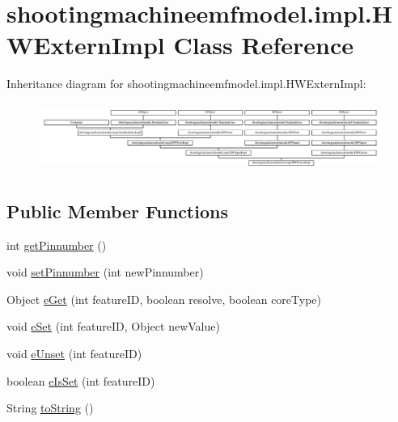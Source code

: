 \hypertarget{classshootingmachineemfmodel_1_1impl_1_1_h_w_extern_impl}{\section{shootingmachineemfmodel.\-impl.\-H\-W\-Extern\-Impl Class Reference}
\label{classshootingmachineemfmodel_1_1impl_1_1_h_w_extern_impl}
}
Inheritance diagram for shootingmachineemfmodel.\-impl.\-H\-W\-Extern\-Impl\-:\begin{figure}[H]
\begin{center}
\leavevmode
\includegraphics[height=2.247492cm]{classshootingmachineemfmodel_1_1impl_1_1_h_w_extern_impl}
\end{center}
\end{figure}
\subsection*{Public Member Functions}
\begin{DoxyCompactItemize}
\item 
int \hyperlink{classshootingmachineemfmodel_1_1impl_1_1_h_w_extern_impl_a86c10c1bc44b1145a93323d6b4abff06}{get\-Pinnumber} ()
\item 
void \hyperlink{classshootingmachineemfmodel_1_1impl_1_1_h_w_extern_impl_a9e4e54dce74f1fc40dbdefa81af30133}{set\-Pinnumber} (int new\-Pinnumber)
\item 
Object \hyperlink{classshootingmachineemfmodel_1_1impl_1_1_h_w_extern_impl_a4e1c5295f9c3786f026629e61b1b2959}{e\-Get} (int feature\-I\-D, boolean resolve, boolean core\-Type)
\item 
void \hyperlink{classshootingmachineemfmodel_1_1impl_1_1_h_w_extern_impl_ae8dfc88c6b3f299e15344464a4d0b3cb}{e\-Set} (int feature\-I\-D, Object new\-Value)
\item 
void \hyperlink{classshootingmachineemfmodel_1_1impl_1_1_h_w_extern_impl_a1de7d9afc04fcd1d287ee21ad1e98ba2}{e\-Unset} (int feature\-I\-D)
\item 
boolean \hyperlink{classshootingmachineemfmodel_1_1impl_1_1_h_w_extern_impl_a9b134e4c93c80c21d88a391556dc65e6}{e\-Is\-Set} (int feature\-I\-D)
\item 
String \hyperlink{classshootingmachineemfmodel_1_1impl_1_1_h_w_extern_impl_a1b08b416eccf033fed48d922b1c38381}{to\-String} ()
\end{DoxyCompactItemize}
